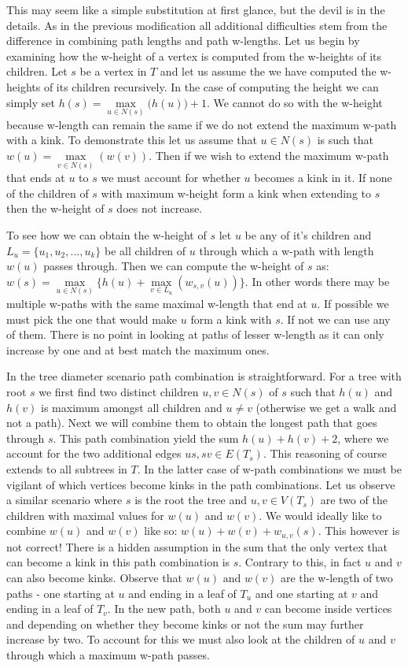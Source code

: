 This may seem like a simple substitution at first glance, but the devil is in the details. As in the previous modification all additional difficulties stem from the difference in combining path lengths and path w-lengths. Let us begin by examining how the w-height of a vertex is computed from the w-heights of its children. Let $s$ be a vertex in $T$ and let us assume the we have computed the w-heights of its children recursively. In the case of computing the height we can simply set $h(s) = \max\limits_{u \in N(s)}\big( h(u) \big) + 1$. We cannot do so with the w-height because w-length can remain the same if we do not extend the maximum w-path with a kink.  To demonstrate this let us assume that $u \in N(s)$ is such that $w(u) = \max\limits_{v \in N(s)}(w(v))$. Then if we wish to extend the maximum w-path that ends at $u$ to $s$ we must account for whether $u$ becomes a kink in it. If none of the children of $s$ with maximum w-height form a kink when extending to $s$ then the w-height of $s$ does not increase.

To see how we can obtain the w-height of $s$ let $u$ be any of it's children and $L_u = \{u_1, u_2, ..., u_k\}$ be all children of $u$ through which a w-path with length $w(u)$ passes through. Then we can compute the w-height of $s$ as: $w(s) = \max\limits_{u \in N(s)}\{ h(u) + \max\limits_{v \in L_u}(w_{s, v}(u)) \}$. In other words there may be multiple w-paths with the same maximal w-length that end at $u$. If possible we must pick the one that would make $u$ form a kink with $s$. If not we can use any of them. There is no point in looking at paths of lesser w-length as it can only increase by one and at best match the maximum ones.


In the tree diameter scenario path combination is straightforward. For a tree with root $s$ we first find two distinct children $u, v \in N(s)$ of $s$ such that $h(u)$ and $h(v)$ is maximum amongst all children and $u \ne v$ (otherwise we get a walk and not a path). Next we will combine them to obtain the longest path that goes through $s$. This path combination yield the sum $h(u) + h(v) + 2$, where we account for the two additional edges $us, sv \in E(T_s)$. This reasoning of course extends to all subtrees in $T$. In the latter case of w-path combinations we must be vigilant of which vertices become kinks in the path combinations. Let us observe a similar scenario where $s$ is the root the tree and $u, v \in V(T_s)$ are two of the children with maximal values for $w(u)$ and $w(v)$. We would ideally like to combine $w(u)$ and $w(v)$ like so: $w(u) + w(v) + w_{u, v}(s)$. This however is not correct! There is a hidden assumption in the sum that the only vertex that can become a kink in this path combination is $s$. Contrary to this, in fact $u$ and $v$ can also become kinks. Observe that $w(u) \text{ and } w(v)$ are the w-length of two paths - one starting at $u$ and ending in a leaf of $T_u$ and one starting at $v$ and ending in a leaf of $T_v$. In the new path, both $u$ and $v$ can become inside vertices and depending on whether they become kinks or not the sum may further increase by two. To account for this we must also look at the children of $u$ and $v$ through which a maximum w-path passes. 


